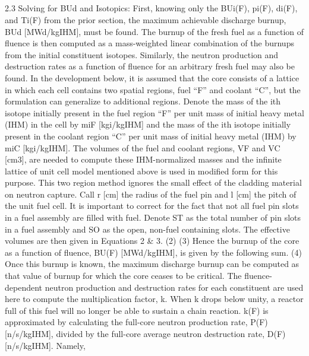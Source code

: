 \subsection{}
\label{1g_sec:}
2.3 Solving for BUd and Isotopics:
First, knowing only the BUi(F), pi(F), di(F), and Ti(F) from the prior section, the maximum achievable discharge burnup, BUd [MWd/kgIHM], must be found.  The burnup of the fresh fuel as a function of fluence is then computed as a mass-weighted linear combination of the burnups from the initial constituent isotopes.  Similarly, the neutron production and destruction rates as a function of fluence for an arbitrary fresh fuel may also be found.  In the development below, it is assumed that the core consists of a lattice in which each cell contains two spatial regions, fuel “F” and coolant “C”, but the formulation can generalize to additional regions.  Denote the mass of the ith isotope initially present in the fuel region “F” per unit mass of initial heavy metal (IHM) in the cell by miF [kgi/kgIHM] and the mass of the ith isotope initially present in the coolant region “C” per unit mass of initial heavy metal (IHM) by miC [kgi/kgIHM].  
The volumes of the fuel and coolant regions, VF and VC [cm3], are needed to compute these IHM-normalized masses and the infinite lattice of unit cell model mentioned above is used in modified form for this purpose.  This two region method ignores the small effect of the cladding material on neutron capture.  Call r [cm] the radius of the fuel pin and l [cm] the pitch of the unit fuel cell.  It is important to correct for the fact that not all fuel pin slots in a fuel assembly are filled with fuel.  Denote ST as the total number of pin slots in a fuel assembly and SO as the open, non-fuel containing slots.  The effective volumes are then given in Equations 2 & 3.
                                         (2)
                         (3)
Hence the burnup of the core as a function of fluence, BU(F) [MWd/kgIHM], is given by the following sum.
                                (4)
Once this burnup is known, the maximum discharge burnup can be computed as that value of burnup for which the core ceases to be critical.  The fluence-dependent neutron production and destruction rates for each constituent are used here to compute the multiplication factor, k.    When k drops below unity, a reactor full of this fuel will no longer be able to sustain a chain reaction.  k(F) is approximated by calculating the full-core neutron production rate, P(F) [n/s/kgIHM], divided by the full-core average neutron destruction rate, D(F) [n/s/kgIHM].  Namely,
